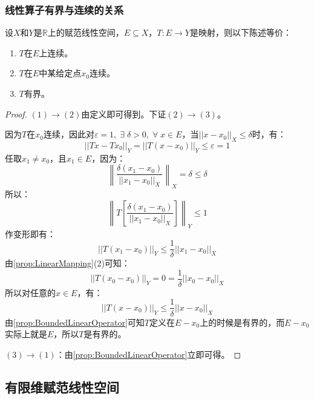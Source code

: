 \subsubsection{线性算子有界与连续的关系}
\begin{theorem}\label{theo:LinearOperatorBoundedContinuous}
	设$X$和$Y$是$\mathbb{R}$上的赋范线性空间，$E\subseteq X$，$T:E\to Y$是映射，则以下陈述等价：
	\begin{enumerate}
		\item $T$在$E$上连续。
		\item $T$在$E$中某给定点$x_0$连续。
		\item $T$有界。
	\end{enumerate}
\end{theorem}
\begin{proof}
	$(1)\to(2)$由定义即可得到。下证$(2)\to(3)$。\par
	因为$T$在$x_0$连续，因此对$\varepsilon=1,\;\exists\;\delta>0,\;\forall\;x\in E$，当$||x-x_0||_X\leqslant\delta$时，有：
	\begin{equation*}
		||Tx-Tx_0||_Y=||T(x-x_0)||_Y\leqslant\varepsilon=1
	\end{equation*}
	任取$x_1\ne x_0$，且$x_1\in E$，因为：
	\begin{equation*}
		\left\|\frac{\delta(x_1-x_0)}{||x_1-x_0||_X}\right\|_X=\delta\leqslant\delta
	\end{equation*}
	所以：
	\begin{equation*}
		\left\|T\left[\frac{\delta(x_1-x_0)}{||x_1-x_0||_X}\right]\right\|_Y\leqslant1
	\end{equation*}
	作变形即有：
	\begin{equation*}
		||T(x_1-x_0)||_Y\leqslant\frac{1}{\delta}||x_1-x_0||_X
	\end{equation*}
	由\cref{prop:LinearMapping}(2)可知：
	\begin{equation*}
		||T(x_0-x_0)||_Y=0=\frac{1}{\delta}||x_0-x_0||_X
	\end{equation*}
	所以对任意的$x\in E$，有：
	\begin{equation*}
		||T(x-x_0)||_Y\leqslant\frac{1}{\delta}||x-x_0||_X
	\end{equation*}
	由\cref{prop:BoundedLinearOperator}可知$T$定义在$E-x_0$上的时候是有界的，而$E-x_0$实际上就是$E$，所以$T$是有界的。\par
	$(3)\to(1)$：由\cref{prop:BoundedLinearOperator}立即可得。
\end{proof}
\subsection{有限维赋范线性空间}
